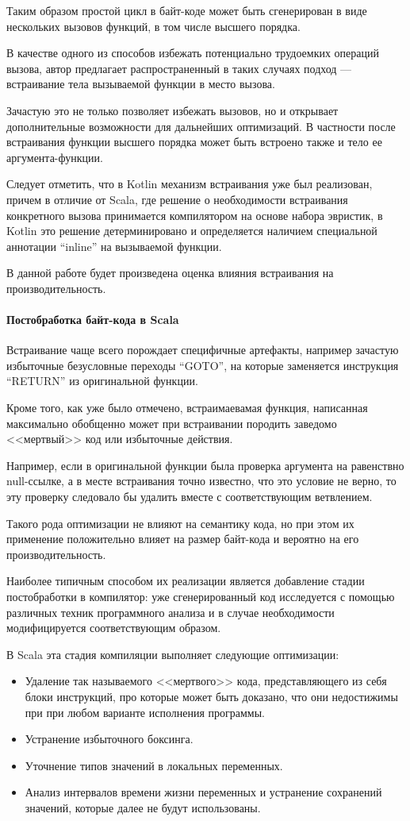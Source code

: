 Таким образом простой цикл в байт-коде может быть сгенерирован в виде нескольких вызовов функций,
в том числе высшего порядка.

В качестве одного из способов избежать потенциально трудоемких операций вызова, автор предлагает
распространенный в таких случаях подход --- встраивание тела вызываемой функции в место
вызова\cite{Muchnick}.

Зачастую это не только позволяет избежать вызовов, но и открывает дополнительные возможности для
дальнейших оптимизаций.
В частности после встраивания функции высшего порядка может быть встроено также и тело ее
аргумента-функции.

Следует отметить, что в Kotlin механизм встраивания уже был реализован, причем в отличие от Scala,
где решение о необходимости встраивания конкретного вызова принимается компилятором на основе
набора эвристик, в Kotlin это решение детерминировано и определяется наличием специальной
аннотации ``inline'' на вызываемой функции.

В данной работе будет произведена оценка влияния встраивания на производительность.

\paragraph{Постобработка байт-кода в Scala}
Встраивание чаще всего порождает специфичные артефакты, например зачастую избыточные безусловные
переходы ``GOTO'', на которые заменяется инструкция ``RETURN'' из оригинальной функции.

Кроме того, как уже было отмечено, встраимаевамая функция, написанная максимально обобщенно может
при встраивании породить заведомо <<мертвый>> код или избыточные действия.

Например, если в оригинальной функции была проверка аргумента на равенствно null-ссылке, а в месте
встраивания точно известно, что это условие не верно, то эту проверку следовало бы удалить вместе
с соответствующим ветвлением.

Такого рода оптимизации не влияют на семантику кода, но при этом их применение положительно влияет
на размер байт-кода и вероятно на его производительность.

Наиболее типичным способом их реализации является добавление стадии постобработки в компилятор:
уже сгенерированный код исследуется с помощью различных техник программного анализа и в случае
необходимости модифицируется соответствующим образом.

В Scala эта стадия компиляции выполняет следующие оптимизации:
\begin{itemize}
    \item Удаление так называемого <<мертвого>> кода, представляющего из себя блоки инструкций,
    про которые может быть доказано, что они недостижимы при при любом варианте исполнения
    программы.
    \item Устранение избыточного боксинга.
    \item Уточнение типов значений в локальных переменных.
    \item Анализ интервалов времени жизни переменных и устранение сохранений значений,
    которые далее не будут использованы.
\end{itemize}

